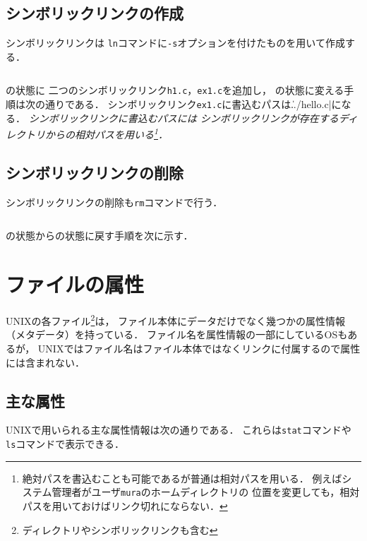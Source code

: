 \subsection*{シンボリックリンクの作成}
シンボリックリンクは
\texttt{ln}コマンドに\texttt{-s}オプションを付けたものを用いて作成する．

\begin{lstlisting}[numbers=none]
% ln -s リンクに書込むパス 作成するリンクのパス
\end{lstlisting}

の状態に
二つのシンボリックリンク\texttt{h1.c}，\texttt{ex1.c}を追加し，
の状態に変える手順は次の通りである．
シンボリックリンク\texttt{ex1.c}に書込むパスは\|../hello.c|になる．
\emph{シンボリックリンクに書込むパスには
シンボリックリンクが存在するディレクトリからの相対パスを用いる\footnote{
絶対パスを書込むことも可能であるが普通は相対パスを用いる．
例えばシステム管理者がユーザ\texttt{mura}のホームディレクトリの
位置を変更しても，相対パスを用いておけばリンク切れにならない．}．}



\subsection*{シンボリックリンクの削除}

シンボリックリンクの削除も\texttt{rm}コマンドで行う．

\begin{lstlisting}[numbers=none]
% rm シンボリックリンクのパス
\end{lstlisting}

の状態からの状態に戻す手順を次に示す．



\section{ファイルの属性}
UNIXの各ファイル\footnote{ディレクトリやシンボリックリンクも含む}は，
ファイル本体にデータだけでなく幾つかの属性情報（メタデータ）を持っている．
ファイル名を属性情報の一部にしているOSもあるが，
UNIXではファイル名はファイル本体ではなくリンクに付属するので属性には含まれない．

\subsection{主な属性}
UNIXで用いられる主な属性情報は次の通りである．
これらは\texttt{stat}コマンドや\texttt{ls}コマンドで表示できる．


